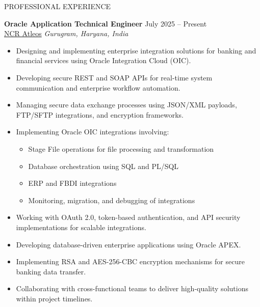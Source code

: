 \documentclass{resume}
\begin{document}
\begin{rSection}{PROFESSIONAL EXPERIENCE}


\textbf{Oracle Application Technical Engineer} \hfill July 2025 -- Present \\
\href{https://ncratleos.com/}{NCR Atleos} \hfill \textit{Gurugram, Haryana, India}

\begin{itemize}[leftmargin=*]

\item Designing and implementing enterprise integration solutions for banking and financial services using Oracle Integration Cloud (OIC).

\item Developing secure REST and SOAP APIs for real-time system communication and enterprise workflow automation.

\item Managing secure data exchange processes using JSON/XML payloads, FTP/SFTP integrations, and encryption frameworks.

\item Implementing Oracle OIC integrations involving:
\begin{itemize}
    \item Stage File operations for file processing and transformation
    \item Database orchestration using SQL and PL/SQL
    \item ERP and FBDI integrations
    \item Monitoring, migration, and debugging of integrations
\end{itemize}

\item Working with OAuth 2.0, token-based authentication, and API security implementations for scalable integrations.

\item Developing database-driven enterprise applications using Oracle APEX.

\item Implementing RSA and AES-256-CBC encryption mechanisms for secure banking data transfer.

\item Collaborating with cross-functional teams to deliver high-quality solutions within project timelines.

\end{itemize}


\end{rSection}
\end{document}
